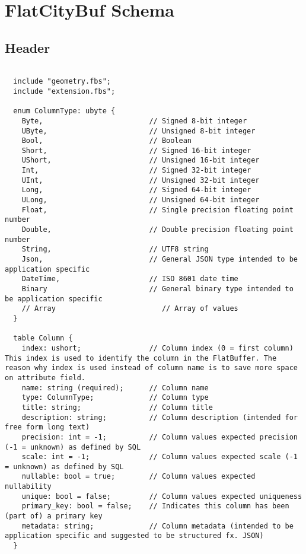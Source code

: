\chapter{FlatCityBuf Schema}
\label{appendix:flatcitybuf_schema}

\section{Header}
\label{appendix:flatcitybuf_schema:header}
\begin{lstlisting}[caption={Header schema of FlatCityBuf},  basicstyle=\small]

  include "geometry.fbs";
  include "extension.fbs";

  enum ColumnType: ubyte {
    Byte,                         // Signed 8-bit integer
    UByte,                        // Unsigned 8-bit integer
    Bool,                         // Boolean
    Short,                        // Signed 16-bit integer
    UShort,                       // Unsigned 16-bit integer
    Int,                          // Signed 32-bit integer
    UInt,                         // Unsigned 32-bit integer
    Long,                         // Signed 64-bit integer
    ULong,                        // Unsigned 64-bit integer
    Float,                        // Single precision floating point number
    Double,                       // Double precision floating point number
    String,                       // UTF8 string
    Json,                         // General JSON type intended to be application specific
    DateTime,                     // ISO 8601 date time
    Binary                        // General binary type intended to be application specific
    // Array                         // Array of values
  }

  table Column {
    index: ushort;                // Column index (0 = first column) This index is used to identify the column in the FlatBuffer. The reason why index is used instead of column name is to save more space on attribute field.
    name: string (required);      // Column name
    type: ColumnType;             // Column type
    title: string;                // Column title
    description: string;          // Column description (intended for free form long text)
    precision: int = -1;          // Column values expected precision (-1 = unknown) as defined by SQL
    scale: int = -1;              // Column values expected scale (-1 = unknown) as defined by SQL
    nullable: bool = true;        // Column values expected nullability
    unique: bool = false;         // Column values expected uniqueness
    primary_key: bool = false;    // Indicates this column has been (part of) a primary key
    metadata: string;             // Column metadata (intended to be application specific and suggested to be structured fx. JSON)
  }


\end{lstlisting}
